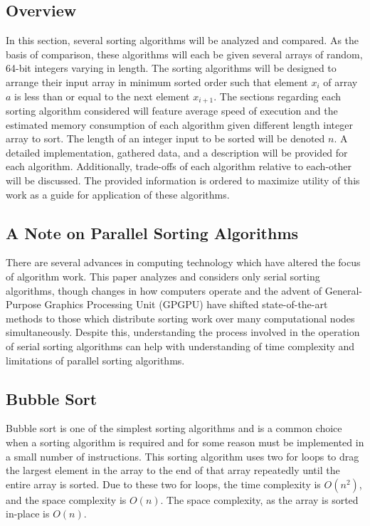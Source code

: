 \documentclass[a4paper]{article}
\begin{document}
\subsection{Overview}
In this section, several sorting algorithms will be analyzed and compared. As the basis of comparison, these algorithms will each be given several arrays of random, 64-bit integers varying in length. The sorting algorithms will be designed to arrange their input array in minimum sorted order such that element $x_i$ of array $a$ is less than or equal to the next element $x_{i+1}$. The sections regarding each sorting algorithm considered will feature average speed of execution and the estimated memory consumption of each algorithm given different length integer array to sort. The length of an integer input to be sorted will be denoted $n$. A detailed implementation, gathered data, and a description will be provided for each algorithm. Additionally, trade-offs of each algorithm relative to each-other will be discussed. The provided information is ordered to maximize utility of this work as a guide for application of these algorithms.

\subsection{A Note on Parallel Sorting Algorithms}
There are several advances in computing technology which have altered the focus of algorithm work. This paper analyzes and considers only serial sorting algorithms, though changes in how computers operate and the advent of General-Purpose Graphics Processing Unit (GPGPU) have shifted state-of-the-art methods to those which distribute sorting work over many computational nodes simultaneously. Despite this, understanding the process involved in the operation of serial sorting algorithms can help with understanding of time complexity and limitations of parallel sorting algorithms.

\subsection{Bubble Sort}
Bubble sort is one of the simplest sorting algorithms and is a common choice when a sorting algorithm is required and for some reason must be implemented in a small number of instructions. This sorting algorithm uses two for loops to drag the largest element in the array to the end of that array repeatedly until the entire array is sorted. Due to these two for loops, the time complexity is $O(n^2)$, and the space complexity is $O(n)$. The space complexity, as the array is sorted in-place is $O(n)$.
\end{document}
